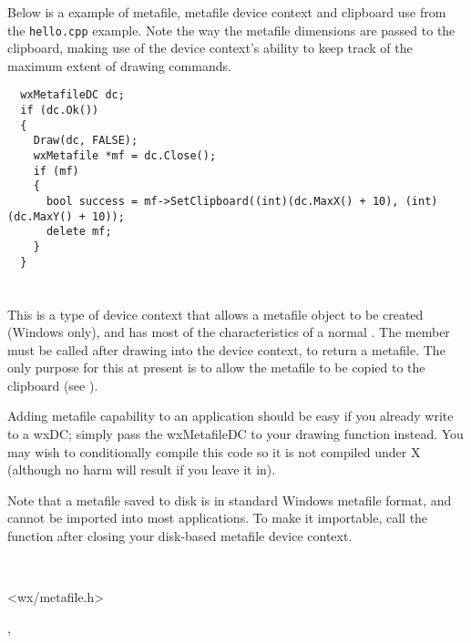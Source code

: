 Below is a example of metafile, metafile device context and clipboard use
from the {\tt hello.cpp} example. Note the way the metafile dimensions
are passed to the clipboard, making use of the device context's ability
to keep track of the maximum extent of drawing commands.

\begin{verbatim}
  wxMetafileDC dc;
  if (dc.Ok())
  {
    Draw(dc, FALSE);
    wxMetafile *mf = dc.Close();
    if (mf)
    {
      bool success = mf->SetClipboard((int)(dc.MaxX() + 10), (int)(dc.MaxY() + 10));
      delete mf;
    }
  }
\end{verbatim}

\section{}\label{wxmetafiledc}

This is a type of device context that allows a metafile object to be
created (Windows only), and has most of the characteristics of a normal
. The  member must be called after drawing into the
device context, to return a metafile. The only purpose for this at
present is to allow the metafile to be copied to the clipboard (see ).

Adding metafile capability to an application should be easy if you
already write to a wxDC; simply pass the wxMetafileDC to your drawing
function instead. You may wish to conditionally compile this code so it
is not compiled under X (although no harm will result if you leave it
in).

Note that a metafile saved to disk is in standard Windows metafile format,
and cannot be imported into most applications. To make it importable,
call the function  after
closing your disk-based metafile device context.


\\


<wx/metafile.h>


, 


